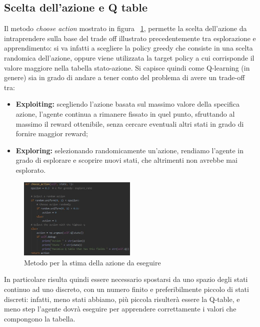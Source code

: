\subsection{Scelta dell'azione e Q table}
Il metodo \textit{choose action} mostrato in figura ~\ref{fig:ChooseAction_Bucket}, permette la scelta dell'azione da intraprendere sulla base del trade off illustrato precedentemente tra esplorazione e apprendimento: si va infatti a scegliere la policy greedy che consiste in una scelta randomica dell'azione, oppure viene utilizzata la target policy a cui corrisponde il valore maggiore nella tabella stato-azione.
Si capisce quindi come Q-learning (in genere) sia in grado di andare a tener conto del problema di avere un trade-off tra:
\begin{itemize}
	\item \textbf{Exploiting: }scegliendo l'azione basata sul massimo valore della specifica azione, l'agente continua a rimanere fissato in quel punto, sfruttando al massimo il reward ottenibile, senza cercare eventuali altri stati in grado di fornire maggior reward;
	\item \textbf{Exploring: }selezionando randomicamente un'azione, rendiamo l'agente in grado di esplorare e scoprire nuovi stati, che altrimenti non avrebbe mai esplorato. 
\end{itemize}
\begin{figure}[!h]
	\centering
	\includegraphics[width=0.5\textwidth]{Immagini/ChooseAction_QTable.JPG}
	\caption{Metodo per la stima della azione da eseguire}
	\label{fig:ChooseAction_Bucket}
\end{figure}

In particolare risulta quindi essere necessario spostarsi da uno spazio degli stati continuo ad uno discreto, con un numero finito e preferibilmente piccolo di stati discreti: infatti, meno stati abbiamo, più piccola risulterà essere la Q-table, e meno step l'agente dovrà eseguire per apprendere correttamente i valori che compongono la tabella. 

